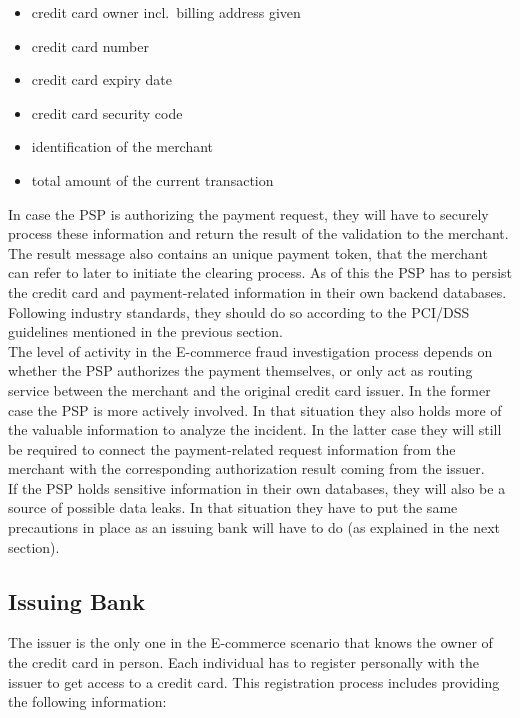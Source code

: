 \begin{itemize}
		\item credit card owner incl.\ billing address given
		\item credit card number
		\item credit card expiry date
		\item credit card security code
		\item identification of the merchant
		\item total amount of the current transaction
\end{itemize}

In case the \gls{PSP} is authorizing the payment request, they will have to securely process these information and return the result of the validation to the merchant. The result message also contains an unique payment token, that the merchant can refer to later to initiate the clearing process. As of this the \gls{PSP} has to persist the credit card and payment-related information in their own backend databases. Following industry standards, they should do so according to the \gls{PCI/DSS} guidelines mentioned in the previous section. \\

The level of activity in the \gls{E-commerce} fraud investigation process depends on whether the \gls{PSP} authorizes the payment themselves, or only act as routing service between the merchant and the original credit card issuer. In the former case the \gls{PSP} is more actively involved. In that situation they also holds more of the valuable information to analyze the incident. In the latter case they will still be required to connect the payment-related request information from the merchant with the corresponding authorization result coming from the issuer. \\

If the \gls{PSP} holds sensitive information in their own databases, they will also be a source of possible data leaks. In that situation they have to put the same precautions in place as an issuing bank will have to do (as explained in the next section).


\subsection{Issuing Bank}
\label{subsec:stakeholder_issuer}

The issuer is the only one in the \gls{E-commerce} scenario that knows the owner of the credit card in person. Each individual has to register personally with the issuer to get access to a credit card. This registration process includes providing the following information: \@

